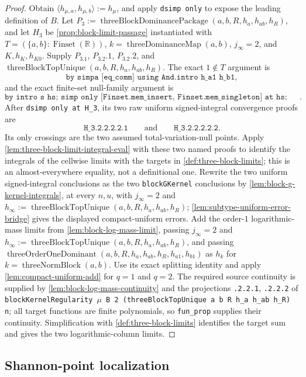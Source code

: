 \documentclass[9pt]{extarticle}
\theoremstyle{definition}
\theoremstyle{remark}
\newcommand{\R}{\mathbb R}
\begin{document}
\begin{proof}
Obtain
$\langle h_{\mu,a},h_{\mu,b}\rangle:=h_\mu$, and apply
\texttt{dsimp only} to expose the leading definition of $B$.  Let
$P_3:=\operatorname{threeBlockDominancePackage}
(a,b,R,h_a,h_{ab},h_R)$, and let $H_3$ be
\cref{prop:block-limit-passage} instantiated with
$T=(\{a,b\}:\operatorname{Finset}(\R))$,
$k=\operatorname{threeDominanceMap}(a,b)$, $j_\infty=2$, and
$K,h_K,h_{K0}$.  Supply $P_3.1$, $P_3.2.1$, $P_3.2.2$, and
$\operatorname{threeBlockTopUnique}(a,b,R,h_a,h_{ab},h_R)$.  The exact
$1\notin T$ argument is
\[
 \texttt{by simpa [eq\_comm] using And.intro h\_a1 h\_b1},
\]
and the exact finite-set null-family argument is
\[
 \texttt{by intro s hs; simp only [Finset.mem\_insert,
 Finset.mem\_singleton] at hs; rcases hs with rfl | rfl;
 all\_goals assumption}.
\]
After \texttt{dsimp only at H\_3}, its two raw uniform signed-integral
convergence proofs are
\[
 \texttt{H\_3.2.2.2.2.1}
 \qquad\text{and}\qquad
 \texttt{H\_3.2.2.2.2.2}.
\]
Its only
crossings are the two assumed total-variation-null points.  Apply
\cref{lem:three-block-limit-integral-eval} with these two named proofs to
identify the integrals of the cellwise limits with the targets in
\cref{def:three-block-limits}; this is an almost-everywhere equality, not a
definitional one.  Rewrite the two uniform signed-integral
conclusions as the two \texttt{blockGKernel} conclusions by
\cref{lem:block-g-kernel-integrals}, at every $n,u$, with $j_\infty=2$ and
$h_\infty:=\operatorname{threeBlockTopUnique}
(a,b,R,h_a,h_{ab},h_R)$; \cref{lem:subtype-uniform-error-bridge} gives the
displayed compact-uniform errors.  Add the order-$1$ logarithmic-mass limits
from \cref{lem:block-log-mass-limit}, passing $j_\infty=2$ and
$h_\infty:=\operatorname{threeBlockTopUnique}(a,b,R,h_a,h_{ab},h_R)$, and
passing
$\operatorname{threeOrderOneDominant}
(a,b,R,h_a,h_{ab},h_R,h_{a1},h_{b1})$ as $h_k$ for
$k=\operatorname{threeNormBlock}(a,b)$.  Use its exact splitting identity
and apply \cref{lem:compact-uniform-add} for $q=1$ and $q=2$.
The required source continuity is supplied by
\cref{lem:block-log-mass-continuity} and the projections
\texttt{.2.2.1}, \texttt{.2.2.2} of
\texttt{blockKernelRegularity $\mu$ B 2
 (threeBlockTopUnique a b R h\_a h\_ab h\_R) n}; all target functions are
finite polynomials, so \texttt{fun\_prop} supplies their continuity.
Simplification with \cref{def:three-block-limits} identifies the target sum
and gives the two logarithmic-column limits.
\end{proof}

\subsection{Shannon-point localization}
\end{document}
